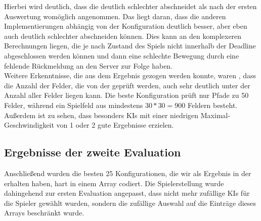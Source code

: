 Hierbei wird deutlich, dass die  deutlich schlechter abschneidet als nach der ersten Auswertung
womöglich angenommen.
Das liegt daran, dass die anderen Implementierungen abhängig von der Konfiguration deutlich besser, aber eben auch
deutlich schlechter abschneiden können.
Dies kann an den komplexeren Berechnungen liegen, die je nach Zustand des Spiels nicht innerhalb der Deadline
abgeschlossen werden können und dann eine schlechte Bewegung durch eine fehlende Rückmeldung an den Server zur Folge
haben. \\

Weitere Erkenntnisse, die aus dem Ergebnis gezogen werden konnte, waren \ua, dass die Anzahl der Felder, die von der
 geprüft werden, auch sehr deutlich unter der Anzahl aller Felder liegen kann.
Die beste Konfiguration prüft nur Pfade zu 50 Felder, während ein Spielfeld aus mindestens $30 * 30 = 900$ Feldern
besteht.
Außerdem ist zu sehen, dass besonders \ac{KIs} mit einer niedrigen Maximal-Geschwindigkeit von 1 oder 2 gute Ergebnisse
erzielen.

\subsection{Ergebnisse der zweite Evaluation}
\label{subsec:zweite-evaluation}

Anschließend wurden die besten 25 Konfigurationen, die wir als Ergebnis in der 
erhalten haben, hart in einem Array codiert.
Die Spielerstellung wurde dahingehend zur ersten Evaluation angepasst, dass nicht mehr zufällige \ac{KI}s für die
Spieler gewählt wurden, sondern die zufällige Auswahl auf die Einträge dieses Arrays beschränkt wurde.

